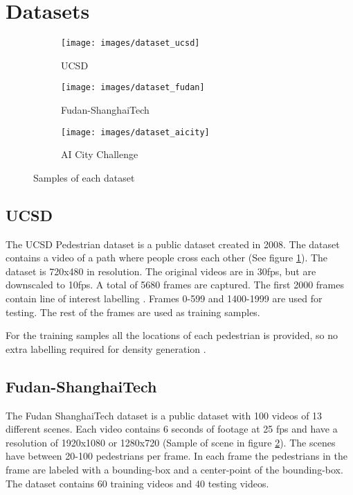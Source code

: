 \section{Datasets}
\begin{figure}[h]
\centering
\begin{subfigure}{.33\textwidth}
  \centering
  \texttt{[image: images/dataset\_ucsd]}
  \caption{UCSD}
  \label{fig:dataset_ucsd}
\end{subfigure}%
\begin{subfigure}{.33\textwidth}
  \centering
  \texttt{[image: images/dataset\_fudan]}
  \caption{Fudan-ShanghaiTech}
  \label{fig:dataset_fudan}
\end{subfigure}%
\begin{subfigure}{.33\textwidth}
  \centering
  \texttt{[image: images/dataset\_aicity]}
  \caption{AI City Challenge}
  \label{fig:dataset_aicity}
\end{subfigure}%
\caption{Samples of each dataset}
\label{fig:datasets}
\end{figure}

\subsection{UCSD}
The UCSD Pedestrian dataset \cite{Chan2008} is a public dataset created in 2008. The dataset contains a video of a path where people cross each other (See figure \ref{fig:dataset_ucsd}). The dataset is 720x480 in resolution. The original videos are in 30fps, but are downscaled to 10fps. A total of 5680 frames are captured. The first 2000 frames contain line of interest labelling \cite{Ma2013}. Frames 0-599 and 1400-1999 are used for testing. The rest of the frames are used as training samples.

For the training samples all the locations of each pedestrian is provided, so no extra labelling required for density generation \cite{Chan2012}.

\subsection{Fudan-ShanghaiTech}
The Fudan ShanghaiTech dataset \cite{Fang2019} is a public dataset with 100 videos of 13 different scenes. Each video contains 6 seconds of footage at 25 fps and have a resolution of 1920x1080 or 1280x720 (Sample of scene in figure \ref{fig:dataset_fudan}). The scenes have between 20-100 pedestrians per frame. In each frame the pedestrians in the frame are labeled with a bounding-box and a center-point of the bounding-box. The dataset contains 60 training videos and 40 testing videos.

